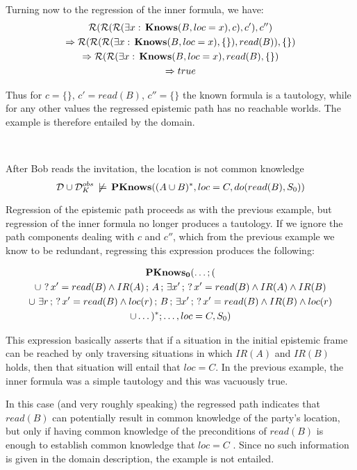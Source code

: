 Turning now to the regression of the inner formula, we have:\begin{gather*}
\mathcal{R}(\mathcal{R}(\mathcal{R}(\exists x:\,\mathbf{Knows}(B,loc=x),c),c'),c'')\\
\Rightarrow\mathcal{R}(\mathcal{R}(\mathcal{R}(\exists x:\,\mathbf{Knows}(B,loc=x),\{\}),read(B)),\{\})\\
\Rightarrow\mathcal{R}(\mathcal{R}(\exists x:\,\mathbf{Knows}(B,loc=x),read(B),\{\})\\
\Rightarrow true\end{gather*}


Thus for $c=\{\}$, $c'=read(B)$, $c''=\{\}$ the known formula is
a tautology, while for any other values the regressed epistemic path
has no reachable worlds. The example is therefore entailed by the
domain.

~

\begin{example}
After Bob reads the invitation, the location is not common knowledge\[
\mathcal{D}\cup\mathcal{D}_{K}^{obs}\,\not\models\,\mathbf{PKnows}((A\cup B)^{*},loc=C,do(read(B),S_{0}))\]

\end{example}
Regression of the epistemic path proceeds as with the previous example,
but regression of the inner formula no longer produces a tautology.
If we ignore the path components dealing with $c$ and $c''$, which
from the previous example we know to be redundant, regressing this
expression produces the following:

\begin{multline*}
\mathbf{PKnows_{0}}(\dots;(\\
\cup\,\,?\, x'=read(B)\wedge IR(A)\,;\, A\,;\,\exists x'\,;\,?\, x'=read(B)\wedge IR(A)\wedge IR(B)\\
\cup\,\,\exists r\,;\,?\, x'=read(B)\wedge loc(r)\,;\, B\,;\,\exists x'\,;\,?\, x'=read(B)\wedge IR(B)\wedge loc(r)\\
\cup\dots)^{*};\dots,loc=C,S_{0})\end{multline*}


This expression basically asserts that if a situation in the initial
epistemic frame can be reached by only traversing situations in which
$IR(A)$ and $IR(B)$ holds, then that situation will entail that
$loc=C$. In the previous example, the inner formula was a simple
tautology and this was vacuously true.

In this case (and very roughly speaking) the regressed path indicates
that $read(B)$ can potentially result in common knowledge of the
party's location, but only if having common knowledge of the preconditions
of $read(B)$ is enough to establish common knowledge that $loc=C$
. Since no such information is given in the domain description, the
example is not entailed.

